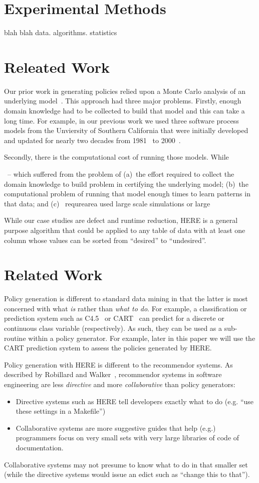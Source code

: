 \documentclass[conference]{IEEEtran}
\newcommand{\bi}{\begin{itemize}}
\newcommand{\ei}{\end{itemize}}
\begin{document}
\section{Experimental Methods}

blah blah data. algorithms. statistics

\section{Releated Work}

Our prior work in generating policies relied upon a Monte Carlo
analysis of an underlying model~\cite{me07f}. This approach had three major problems.
Firstly, enough domain knowledge had to be collected to build that model
and this can take a long time. For example, in our previous work we used three software process models from
the Unviersity of Southern California that were initially
developed and updated for nearly two decades from 1981~\cite{boehm81} to 2000~\cite{boehm00b}.

Secondly, there is the computational cost of running those models.
While 

~\cite{}-- which suffered from the problem of (a)~the effort required to collect the domain knowledge to build
problem in certifying the underlying model;
 (b)~the computational problem of running that model enough
times to learn patterns in that data; and (c)~ requrearea used large scale simulations or large


While
our case studies are defect and runtime reduction, HERE is a general
purpose algorithm that could be applied to any table of data with at least
one column whose values can be sorted from ``desired'' to ``undesired''.

\section{Related Work}
Policy generation is different to standard data mining in that the 
latter is most concerned with what {\em is} rather than {\em what to do}.
For example, a classification or prediction system such as C4.5~\cite{quinlan92} or CART~\cite{breiman84} can predict for a discrete or continuous class variable
(respectively). As such, they can be used as a sub-routine within a
policy generator. For example, later in this paper we will use the CART
prediction system to assess the policies generated by HERE.


Policy generation with HERE is different to the recommendor systems.
As described by Robillard and Walker~\cite{rob14}, recommendor systems
in software engineering
are less {\em directive} and more    {\em collaborative} than policy
generators:
\bi
\item
Directive systems such as HERE tell developers exactly what to do
(e.g. ``use these settings in a Makefile'') 
\item
Collaborative systems are more suggestive guides that
help (e.g.) programmers focus on very small sets
with  very large libraries of code of documentation.
\ei
Collaborative systems may not presume to know what to do
in that smaller set (while the directive systems would issue an edict
such as  ``change this to that'').
\end{document}
